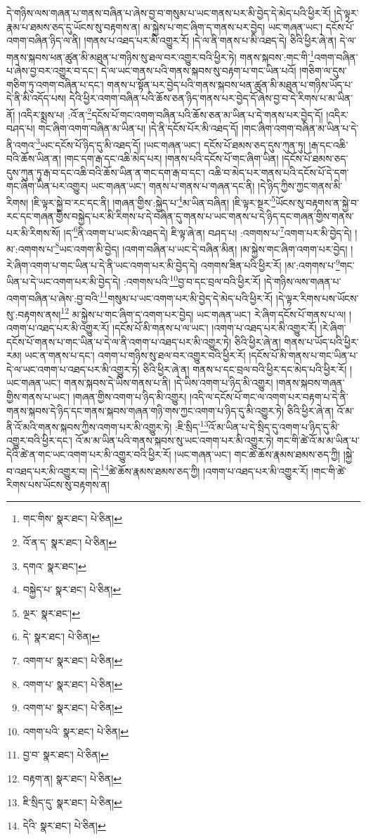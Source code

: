 དེ་གཉིས་ལས་གཞན་པ་གནས་བཞིན་པ་ཞེས་བྱ་བ་གསུམ་པ་ཡང་གནས་པར་མི་བྱེད་དེ་མེད་པའི་ཕྱིར་རོ། །དེ་ལྟར་རྣམ་པ་ཐམས་ཅད་དུ་ཡོངས་སུ་བརྟགས་ན། མ་སྐྱེས་པ་གང་ཞིག་ད་གནས་པར་བྱེད། ཡང་གཞན་ཡང་། དངོས་པོ་འགག་བཞིན་ཉིད་ལ་ནི། །གནས་པ་འཐད་པར་མི་འགྱུར་རོ། །དེ་ལ་ནི་གནས་པ་མི་འཐད་དེ། ཅིའི་ཕྱིར་ཞེ་ན། དེ་ལ་གནས་སྐབས་ཕན་ཚུན་མི་མཐུན་པ་གཉིས་སུ་ཐལ་བར་འགྱུར་བའི་ཕྱིར་ཏེ། གནས་སྐབས་:གང་གི་\footnote{གང་གིས་  སྣར་ཐང་།  པེ་ཅིན། }འགག་བཞིན་པ་ཞེས་བྱ་བར་འགྱུར་བ་དང་། དེ་ལ་ཡང་གནས་པའི་གནས་སྐབས་སུ་བརྟག་པ་གང་ཡིན་པའོ། །གཅིག་ལ་དུས་གཅིག་ཏུ་འགག་བཞིན་པ་དང་། གནས་པ་སྟོན་པར་བྱེད་པའི་གནས་སྐབས་ཕན་ཚུན་མི་མཐུན་པ་གཉིས་ཡོད་པ་དེ་ནི་མི་འདོད་པས། དེའི་ཕྱིར་འགག་བཞིན་པའི་ཆོས་ཅན་ཉིད་གནས་པར་བྱེད་དོ་ཞེས་བྱ་བ་དེ་རིགས་པ་མ་ཡིན་ནོ། །འདིར་སྨྲས་པ། :འོ་ན་\footnote{འོ་ན་ད་  སྣར་ཐང་།  པེ་ཅིན། }དངོས་པོ་གང་འགག་བཞིན་པའི་ཆོས་ཅན་མ་ཡིན་པ་དེ་གནས་པར་བྱེད་དོ། །འདིར་བཤད་པ། གང་ཞིག་འགག་བཞིན་མ་ཡིན་པ། །དེ་ནི་དངོས་པོར་མི་འཐད་དོ། །གང་ཞིག་འགག་བཞིན་མ་ཡིན་པ་དེ་ནི་འགའ་\footnote{དགའ་  སྣར་ཐང་། }ཡང་དངོས་པོ་ཉིད་དུ་མི་འཐད་དོ། །ཡང་གཞན་ཡང་། དངོས་པོ་ཐམས་ཅད་དུས་ཀུན་ཏུ། །རྒ་དང་འཆི་བའི་ཆོས་ཡིན་ན། །གང་དག་རྒ་དང་འཆི་མེད་པར། །གནས་པའི་དངོས་པོ་གང་ཞིག་ཡིན། །དངོས་པོ་ཐམས་ཅད་དུས་ཀུན་ཏུ་རྒ་བ་དང་འཆི་བའི་ཆོས་ཡིན་ན་གང་དག་རྒ་བ་དང་། འཆི་བ་མེད་པར་གནས་པའི་དངོས་པོ་དེ་དག་གང་ཞིག་ཡིན་པར་འགྱུར། ཡང་གཞན་ཡང་། གནས་པ་གནས་པ་གཞན་དང་ནི། །དེ་ཉིད་ཀྱིས་ཀྱང་གནས་མི་རིགས། །ཇི་ལྟར་སྐྱེ་བ་རང་དང་ནི། །གཞན་གྱིས་:སྐྱེད་པ་\footnote{བསྐྱེད་པ་  སྣར་ཐང་།  པེ་ཅིན། }མ་ཡིན་བཞིན། །ཇི་ལྟར་སྔར་\footnote{ལྔར་  སྣར་ཐང་། }ཡོངས་སུ་བརྟགས་ན་སྐྱེ་བ་རང་དང་གཞན་གྱིས་བསྐྱེད་པར་མི་རིགས་པ་དེ་བཞིན་དུ་གནས་པ་ཡང་གནས་པ་དེ་ཉིད་དང་གཞན་གྱིས་གནས་པར་མི་རིགས་སོ། །ད་\footnote{དེ་  སྣར་ཐང་།  པེ་ཅིན། }ནི་འགག་པ་ཡང་མི་འཐད་དེ། ཇི་ལྟ་ཞེ་ན། བཤད་པ། :འགགས་པ་\footnote{འགག་པ་  སྣར་ཐང་།  པེ་ཅིན། }འགག་པར་མི་བྱེད་དེ། །མ་:འགགས་པ་\footnote{འགག་པ་  སྣར་ཐང་།  པེ་ཅིན། }ཡང་འགག་མི་བྱེད། །འགག་བཞིན་པ་ཡང་དེ་བཞིན་མིན། །མ་སྐྱེས་གང་ཞིག་འགག་པར་བྱེད། །རེ་ཞིག་འགག་པ་གང་ཡིན་པ་དེ་ནི་ཡང་འགག་པར་མི་བྱེད་དེ། འགགས་ཟིན་པའི་ཕྱིར་རོ། །མ་:འགགས་པ་\footnote{འགག་པ་  སྣར་ཐང་།  པེ་ཅིན། }གང་ཡིན་པ་དེ་ཡང་འགག་པར་མི་བྱེད་དེ། :འགགས་པའི་\footnote{འགག་པའི་  སྣར་ཐང་།  པེ་ཅིན། }བྱ་བ་དང་བྲལ་བའི་ཕྱིར་རོ། །དེ་གཉིས་ལས་གཞན་པ་འགག་བཞིན་པ་ཞེས་:བྱ་བའི་\footnote{བྱ་བ་  སྣར་ཐང་།  པེ་ཅིན། }གསུམ་པ་ཡང་འགག་པར་མི་བྱེད་དེ་མེད་པའི་ཕྱིར་རོ། །དེ་ལྟར་རིགས་པས་ཡོངས་སུ་:བརྟགས་ནས།\footnote{བརྟག་ན།  སྣར་ཐང་།  པེ་ཅིན། } མ་སྐྱེས་པ་གང་ཞིག་ད་འགག་པར་བྱེད། ཡང་གཞན་ཡང་། རེ་ཞིག་དངོས་པོ་གནས་པ་ལ། །འགག་པ་འཐད་པར་མི་འགྱུར་རོ། །དངོས་པོ་མི་གནས་པ་ལ་ཡང་། །འགག་པ་འཐད་པར་མི་འགྱུར་རོ། །རེ་ཞིག་དངོས་པོ་གནས་པ་གང་ཡིན་པ་དེ་ལ་ནི་འགག་པ་འཐད་པར་མི་འགྱུར་ཏེ། ཅིའི་ཕྱིར་ཞེ་ན། གནས་པ་ཡོད་པའི་ཕྱིར་རམ། ཡང་ན་གནས་པ་དང་། འགག་པ་གཉིས་སུ་ཐལ་བར་འགྱུར་བའི་ཕྱིར་རོ། །དངོས་པོ་མི་གནས་པ་གང་ཡིན་པ་དེ་ལ་ཡང་འགག་པ་འཐད་པར་མི་འགྱུར་ཏེ། ཅིའི་ཕྱིར་ཞེ་ན། གནས་པ་དང་བྲལ་བའི་ཕྱིར་དང་མེད་པའི་ཕྱིར་རོ། །ཡང་གཞན་ཡང་། གནས་སྐབས་དེ་ཡིས་གནས་པ་ནི། །དེ་ཡིས་འགག་པ་ཉིད་མི་འགྱུར། །གནས་སྐབས་གཞན་གྱིས་གནས་པ་ཡང་། །གཞན་གྱིས་འགག་པ་ཉིད་མི་འགྱུར། །འདི་ལ་དངོས་པོ་གང་ལ་འགག་པར་བརྟག་པ་དེ་ནི་གནས་སྐབས་དེ་ཉིད་དང་གནས་སྐབས་གཞན་གཉི་གས་ཀྱང་འགག་པ་ཉིད་དུ་མི་འགྱུར་ཏེ། ཅིའི་ཕྱིར་ཞེ་ན། འོ་མ་ནི་འོ་མའི་གནས་སྐབས་ཀྱིས་འགག་པར་མི་འགྱུར་ཏེ། :ཇི་སྲིད་\footnote{ཇི་སྲིད་དུ་  སྣར་ཐང་།  པེ་ཅིན། }འོ་མ་ཡིན་པ་དེ་སྲིད་དུ་འགག་པ་ཉིད་དུ་མི་འགྱུར་བའི་ཕྱིར་དང་། འོ་མ་མ་ཡིན་པའི་གནས་སྐབས་སུ་ཡང་འགག་པར་མི་འགྱུར་ཏེ། གང་གི་ཚེ་འོ་མ་མ་ཡིན་པ་དེའི་ཚེ་ན་གང་ཡང་འགག་པར་མི་འགྱུར་བའི་ཕྱིར་རོ། །ཡང་གཞན་ཡང་། གང་ཚེ་ཆོས་རྣམས་ཐམས་ཅད་ཀྱི། །སྐྱེ་བ་འཐད་པར་མི་འགྱུར་བ། །དེ་\footnote{དེའི་  སྣར་ཐང་།  པེ་ཅིན། }ཚེ་ཆོས་རྣམས་ཐམས་ཅད་ཀྱི། །འགག་པ་འཐད་པར་མི་འགྱུར་རོ། །གང་གི་ཚེ་རིགས་པས་ཡོངས་སུ་བརྟགས་ན། 